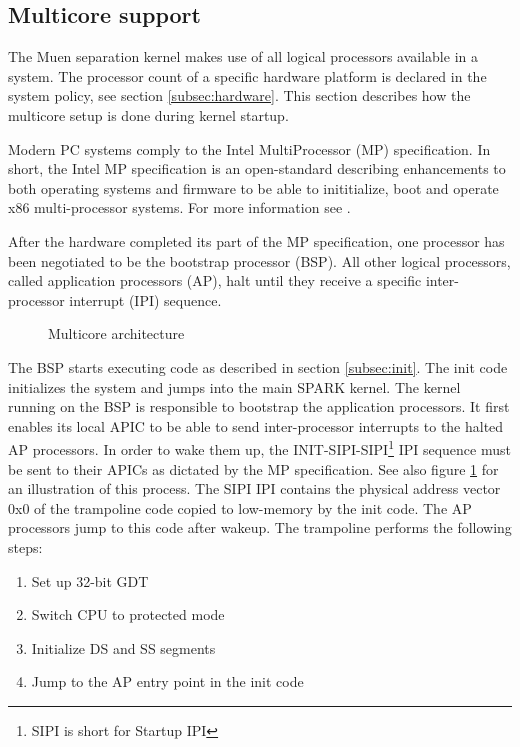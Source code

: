 \subsection{Multicore support}\label{subsec:mp-support}
The Muen separation kernel makes use of all logical processors available in a
system. The processor count of a specific hardware platform is declared in the
system policy, see section \ref{subsec:hardware}. This section describes how
the multicore setup is done during kernel startup.

Modern PC systems comply to the Intel MultiProcessor (MP)
specification. In short, the Intel MP specification is an open-standard
describing enhancements to both operating systems and firmware to be able to
inititialize, boot and operate x86 multi-processor systems. For more information
see \cite{intel:mp}.

After the hardware completed its part of the MP specification, one processor
has been negotiated to be the bootstrap processor (BSP). All other
logical processors, called application processors (AP), halt until
they receive a specific inter-processor interrupt (IPI) sequence.

\begin{figure}[h]
	\centering
	
	\caption{Multicore architecture}
	\label{fig:mp-overview}
\end{figure}

The BSP starts executing code as described in section \ref{subsec:init}. The
init code initializes the system and jumps into the main SPARK kernel. The
kernel running on the BSP is responsible to bootstrap the application
processors. It first enables its local APIC to be able to send
inter-processor interrupts to the halted AP processors. In order to wake them
up, the INIT-SIPI-SIPI\footnote{SIPI is short for Startup
IPI} IPI sequence must be sent to their
APICs as dictated by the MP specification. See also figure
\ref{fig:mp-overview} for an illustration of this process. The SIPI IPI
contains the physical address vector 0x0 of the trampoline code copied to
low-memory by the init code. The AP processors jump
to this code after wakeup. The trampoline performs the following steps:

\begin{enumerate}
	\item Set up 32-bit GDT
	\item Switch CPU to protected mode
	\item Initialize DS and SS segments
	\item Jump to the AP entry point in the init code
\end{enumerate}

